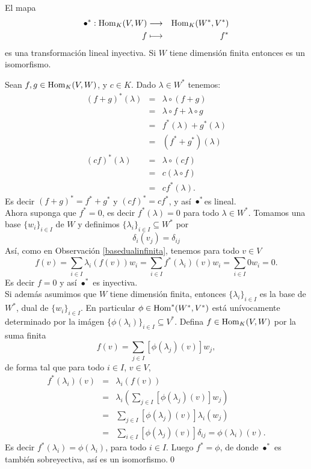 \begin{teo}
El mapa
\begin{eqnarray*}
\bullet^*:\operatorname{Hom}_K(V,W) & \longrightarrow & \operatorname{Hom}_K(W^*,V^*)\\
f & \longmapsto & f^*
\end{eqnarray*}
es una transformaci\'on lineal inyectiva. Si $W$ tiene dimensi\'on finita entonces es un isomorfismo.
\end{teo}

\dem Sean $f,g\in\operatorname{Hom}_K(V,W)$, y $c\in K$. Dado $\lambda\in W^*$ tenemos:
\begin{eqnarray*}
(f+g)^*(\lambda) & = & \lambda\circ(f+g)\\
   & = & \lambda\circ f+\lambda\circ g\\
   & = & f^*(\lambda)+g^*(\lambda)\\
   & = & (f^*+g^*)(\lambda)\\
(cf)^*(\lambda) & = &  \lambda\circ (cf)\\
   & = & c(\lambda\circ f)\\
   & = & cf^*(\lambda).
\end{eqnarray*}
Es decir $(f+g)^*=f^*+g^*$ y $(cf)^*=cf^*$, y as\'i $\bullet^*$es lineal.\\
Ahora suponga que $f^*=0$, es decir $f^*(\lambda)=0$ para todo $\lambda\in W^*$. Tomamos una base $\{w_i\}_{i\in I}$ de $W$ y definimos $\{\lambda_i\}_{i\in I}\subseteq W^*$ por
\[
\delta_i(v_j)=\delta_{ij}
\]
As\'i, como en Observaci\'on \ref{basedualinfinita}, tenemos para todo $v\in V$
\[
f(v)=\sum_{i\in I}\lambda_i\left(f(v)\right)w_i=\sum_{i\in I} f^*(\lambda_i)(v)w_i=\sum_{i\in I} 0w_i=0.
\]
Es decir $f=0$ y as\'i $\bullet^*$ es inyectiva.\\
Si adem\'as asumimos que $W$ tiene dimensi\'on finita, entonces $\{\lambda_i\}_{i\in I}$ es la base de $W^*$, dual de $\{w_i\}_{i\in I}$. En particular $\phi\in\operatorname{Hom}^*(W^*,V^*)$ est\'a un\'ivocamente determinado por la im\'agen $\{\phi(\lambda_i)\}_{i\in I}\subseteq V^*$. Defina $f\in\operatorname{Hom}_K(V,W)$ por la suma finita
\[
f(v)=\sum_{j\in I}\left[\phi(\lambda_j)(v)\right]w_j,
\]
de forma tal que para todo $i\in I$, $v\in V$,
\begin{eqnarray*}
f^*(\lambda_i)(v) & = & \lambda_i(f(v))\\
 & = & \lambda_i\left(\sum_{j\in I}\left[\phi(\lambda_j)(v)\right]w_j\right)\\
 & = & \sum_{j\in I}\left[\phi(\lambda_j)(v)\right]\lambda_i(w_j)\\
 & = & \sum_{i\in I}\left[\phi(\lambda_j)(v)\right]\delta_{ij}=\phi(\lambda_i)(v).
\end{eqnarray*}
Es decir $f^*(\lambda_i)=\phi(\lambda_i)$, para todo $i\in I$. Luego $f^*=\phi$, de donde $\bullet^*$ es tambi\'en sobreyectiva, as\'i es un isomorfismo.\qed

